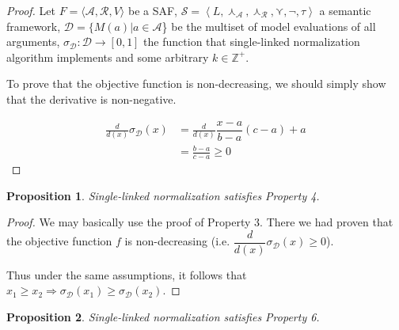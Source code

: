 \documentclass{article}
\newtheorem{proposition}{Proposition}
\newcommand{\args}{\mathcal{A}} %
\newcommand{\att}{\mathcal{R}}  %
\newcommand{\valueset}{L}
\newcommand{\safid}{F}               %
\newcommand{\saf}{\safid = \safbody} %
\newcommand{\safbody}{\langle \args, \att, V \rangle} %
\newcommand{\sembodyNew}{\left\langle \valueset,\SAFand_\mathcal{A}, \SAFand_\mathcal{R},\SAFor,\lnot,\tau \right\rangle} %
\newcommand{\SAFand}{\curlywedge}     %
\newcommand{\SAFor}{\curlyvee}        %
\newcommand{\sem}{\mathcal{S}}
\newcommand{\dataset}{\mathcal{D}}   %
\begin{document}
\begin{proof}
Let $\saf$ be a SAF, $\sem = \sembodyNew$ a semantic framework, $\dataset = \{M(a)|a \in \args$\} be the multiset of model evaluations of all arguments, $\sigma_{\dataset}: \dataset  \rightarrow  [0,1]$ the function that single-linked normalization algorithm implements and some arbitrary $k \in \mathbb{Z}^{+}$.

To prove that the objective function is non-decreasing, we should simply show that the derivative is non-negative.

\begin{align*}
  \frac{d}{d(x)} \sigma_{\dataset}(x)
  &= \frac{d}{d(x)} \dfrac{x-a}{b-a} (c-a) + a
 \\ &=  \frac{b-a}{c-a} \geq 0               \>                 \tag{$1 \geq c \geq b \geq a \geq 0$}
\end{align*}

\end{proof}

\begin{proposition}
Single-linked normalization satisfies Property 4.
\end{proposition}

\begin{proof}
We may basically use the proof of Property 3. There we had proven that the objective function $f$ is non-decreasing (i.e. $\dfrac{d}{d(x)} \sigma_{\dataset}(x) \geq 0$).

Thus under the same assumptions, it follows that  $x_1 \geq x_2 \Longrightarrow \sigma_{\dataset}(x_1) \geq \sigma_{\dataset}(x_2)$.

\end{proof}


\begin{proposition}
Single-linked normalization satisfies Property 6.
\end{proposition}
\end{document}
